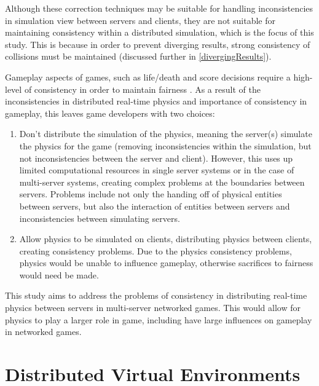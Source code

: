 Although these correction techniques may be suitable for handling inconsistencies in simulation view between servers and clients, they are not suitable for maintaining consistency within a distributed simulation, which is the focus of this study. This is because in order to prevent diverging results, strong consistency of collisions must be maintained (discussed further in \ref{divergingResults}). 

Gameplay aspects of games, such as life/death and score decisions require a high-level of consistency in order to maintain fairness \cite{savery2014consistency}. As a result of the inconsistencies in distributed real-time physics and importance of consistency in gameplay, this leaves game developers with two choices:
\begin{enumerate}
	\item Don't distribute the simulation of the physics, meaning the server(s) simulate the physics for the game (removing inconsistencies within the simulation, but not inconsistencies between the server and client). However, this uses up limited computational resources in single server systems or in the case of multi-server systems, creating complex problems at the boundaries between servers. Problems include not only the handing off of physical entities between servers, but also the interaction of entities between servers and inconsistencies between simulating servers.
	\item Allow physics to be simulated on clients, distributing physics between clients, creating consistency problems. Due to the physics consistency problems, physics would be unable to influence gameplay, otherwise sacrifices to fairness would need be made.
\end{enumerate}

This study aims to address the problems of consistency in distributing real-time physics between servers in multi-server networked games. This would allow for physics to play a larger role in game, including have large influences on gameplay in networked games.

\section{Distributed Virtual Environments} \label{distrubted_virtual_env}

